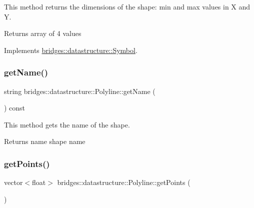 This method returns the dimensions of the shape\+: min and max values in X and Y. 

\begin{DoxyReturn}{Returns}
array of 4 values 
\end{DoxyReturn}


Implements \hyperlink{classbridges_1_1datastructure_1_1_symbol_a5c1cb50770c4f4a2ff9c8642afc0d665}{bridges\+::datastructure\+::\+Symbol}.

\mbox{\label{classbridges_1_1datastructure_1_1_polyline_a46f2830cd85a09e9c4d62d54110dbe13}} 
\subsubsection{\texorpdfstring{get\+Name()}{getName()}}
{\footnotesize\ttfamily string bridges\+::datastructure\+::\+Polyline\+::get\+Name (\begin{DoxyParamCaption}{ }\end{DoxyParamCaption}) const\hspace{0.3cm}{\ttfamily [inline]}}



This method gets the name of the shape. 

\begin{DoxyReturn}{Returns}
name shape name 
\end{DoxyReturn}
\mbox{\label{classbridges_1_1datastructure_1_1_polyline_a634034b6874af45e2b8c56d70e8725c5}} 
\subsubsection{\texorpdfstring{get\+Points()}{getPoints()}}
{\footnotesize\ttfamily vector$<$float$>$ bridges\+::datastructure\+::\+Polyline\+::get\+Points (\begin{DoxyParamCaption}{ }\end{DoxyParamCaption})\hspace{0.3cm}{\ttfamily [inline]}}



